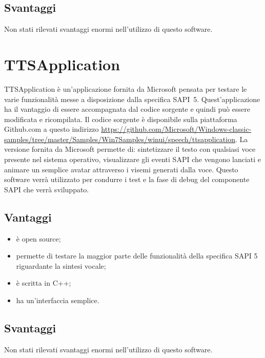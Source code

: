 \subsection*{Svantaggi}
Non stati rilevati svantaggi enormi nell'utilizzo di questo software.   
\section{TTSApplication}
TTSApplication è un'applicazione fornita da Microsoft pensata per testare le varie funzionalità messe a disposizione dalla specifica SAPI~5. Quest'applicazione ha il vantaggio di essere accompagnata dal codice sorgente e quindi può essere modificata e ricompilata. Il codice sorgente è disponibile sulla piattaforma Github.com a questo indirizzo \url{https://github.com/Microsoft/Windows-classic-samples/tree/master/Samples/Win7Samples/winui/speech/ttsapplication}.
La versione fornita da Microsoft permette di: sintetizzare il testo con qualsiasi voce presente nel sistema operativo, visualizzare gli eventi SAPI che vengono lanciati e animare un semplice avatar attraverso i visemi generati dalla voce.
Questo software verrà utilizzato per condurre i test e la fase di debug del componente SAPI che verrà sviluppato. 
\subsection*{Vantaggi}
\begin{itemize}
	\item è open source;
	\item permette di testare la maggior parte delle funzionalità della specifica SAPI 5 riguardante la sintesi vocale;
	\item è scritta in C++;
	\item ha un'interfaccia semplice.
\end{itemize}
\subsection*{Svantaggi}
Non stati rilevati svantaggi enormi nell'utilizzo di questo software.
